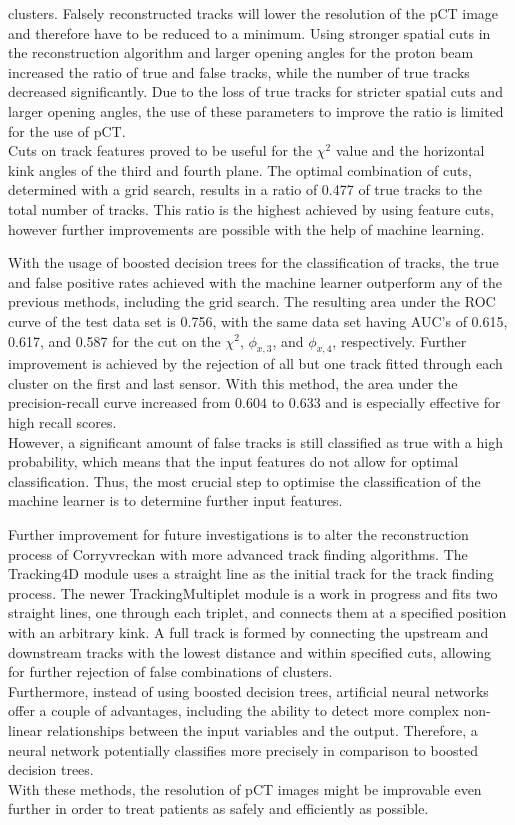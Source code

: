 clusters. Falsely reconstructed tracks will lower the resolution of the pCT image and therefore have to be reduced to a minimum. Using stronger spatial cuts
in the reconstruction algorithm and larger
opening angles for the proton beam increased the ratio of true and false tracks, while the number of true tracks decreased significantly. Due to the loss of
true tracks for stricter spatial cuts and larger opening angles, the use of these parameters to improve the ratio is limited for the use of pCT. \\
Cuts on track features proved to be useful for the $\chi^2$ value and the horizontal kink angles of the third and fourth plane.
The optimal combination of cuts, determined
with a grid search, results in a ratio of 0.477 of true tracks to the total number of tracks.
This ratio is the highest achieved by using feature cuts, however further improvements are possible
with the help of machine learning.

With the usage of boosted decision trees for the classification of tracks, the true and false positive rates achieved with the machine learner outperform any of the previous methods, including the grid search.
The resulting area under the ROC curve of the test data set is 0.756, with the same data set having AUC's of
0.615, 0.617, and 0.587 for the cut on the $\chi^2$, $\phi_{x,3}$, and $\phi_{x,4}$, respectively. Further improvement is achieved by the rejection of all but one track
fitted through each cluster on the first and last sensor.
With this method, the area under the precision-recall curve increased from $0.604$ to $0.633$ and is especially
effective for high recall scores. \\
However, a significant amount of false tracks is still classified as true
with a high probability, which means that the input features do not allow for optimal classification.
Thus, the most crucial step to optimise the classification of the machine learner is to determine further input features.

Further improvement for future investigations
is to alter the reconstruction process of Corryvreckan with more advanced track finding algorithms.
The Tracking4D module uses a straight line as the initial track for
the track finding process. The newer TrackingMultiplet module is a work in progress and fits two straight lines,
one through each triplet, and connects them at a specified position with an arbitrary kink.
A full track is formed by connecting the upstream and downstream tracks with the lowest distance and within specified cuts,
allowing for further rejection of false combinations of clusters. \\
Furthermore, instead of using boosted decision trees, artificial neural networks \cite{ann} offer a couple of advantages,
including the ability to detect more complex non-linear relationships between the input variables and the output. Therefore, a neural network potentially classifies
more precisely in comparison to boosted decision trees. \\
With these methods, the resolution of pCT images might be improvable even further in order to treat patients as safely and efficiently as possible.
